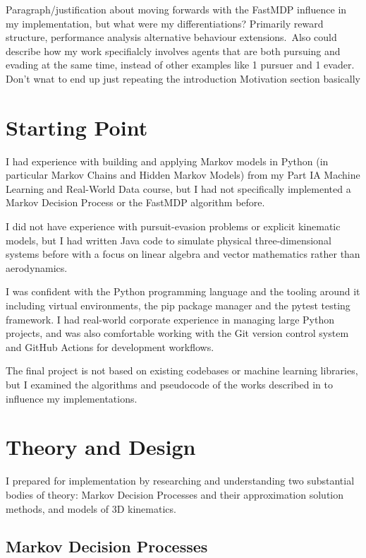 Paragraph/justification about moving forwards with the FastMDP influence in my implementation, but what were my differentiations? Primarily reward structure, performance analysis alternative behaviour extensions.\
Also could describe how my work specifialcly involves agents that are both pursuing and evading at the same time, instead of other examples like 1 pursuer and 1 evader.
Don't wnat to end up just repeating the introduction Motivation section basically

\section{Starting Point}
\label{sec:2.2}
I had experience with building and applying Markov models in Python (in particular Markov Chains and Hidden Markov Models) from my Part IA Machine Learning and Real-World Data course, but I had not specifically implemented a Markov Decision Process or the FastMDP algorithm before.

I did not have experience with pursuit-evasion problems or explicit kinematic models, but I had written Java code to simulate physical three-dimensional systems before with a focus on linear algebra and vector mathematics rather than aerodynamics.

I was confident with the Python programming language and the tooling around it including virtual environments, the pip package manager and the pytest testing framework. I had real-world corporate experience in managing large Python projects, and was also comfortable working with the Git version control system and GitHub Actions for development workflows.

The final project is not based on existing codebases or machine learning libraries, but I examined the algorithms and pseudocode of the works described in  to influence my implementations.

\section{Theory and Design}
\label{sec:2.3}
I prepared for implementation by researching and understanding two substantial bodies of theory: Markov Decision Processes and their approximation solution methods, and models of 3D kinematics. 


\subsection{Markov Decision Processes}
\label{sec:2.3.1}

